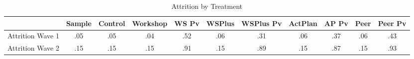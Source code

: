 \begin{table}[htbp]
\caption{\label{clabel} Attrition by Treatment \label{tab:attrition}}\centering\medskip
\begin{tabular}{lcccccccccc} \hline \hline
 & Sample  & Control  & Workshop  & WS Pv  & WSPlus  & WSPlus Pv  & ActPlan  & AP Pv  & Peer  & Peer Pv  \\  \hline 
Attrition Wave 1 & .05 & .05 & .04 & .52 & .06 & .31 & .06 & .37 & .06 & .43 \\  
Attrition Wave 2 & .15 & .15 & .15 & .91 & .15 & .89 & .15 & .87 & .15 & .93 \\  
\hline \hline \end{tabular}
\end{table}
